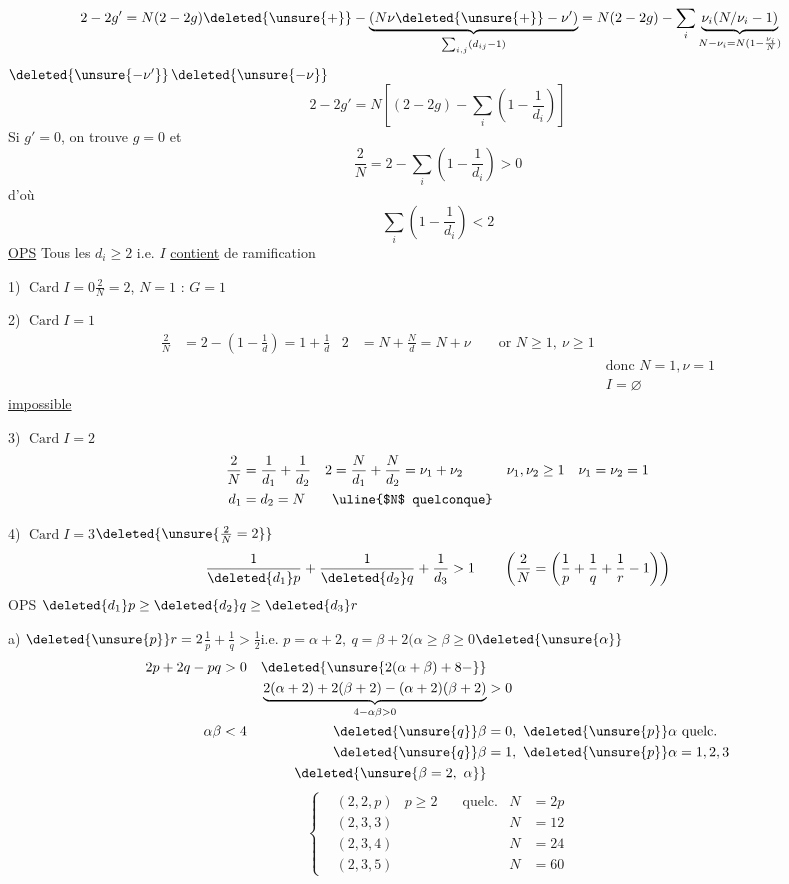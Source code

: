 \[
\begin{aligned}
2-2g'&=N(2-2g)\deleted{\unsure{+}}-\underbrace{(N\nu\deleted{\unsure{+}}-\nu')}_{\sum_{i,j}(d_{ij}-1)}=N(2-2g)-\sum_i\underbrace{\nu_i(N/\nu_i-1)}_{N-\nu_i=N(1-\frac{\nu_i}{N})}
\end{aligned}
\]
$\deleted{\unsure{-\nu'}}$\qquad $\deleted{\unsure{-\nu}}$
\[
\boxed{2-2g'=N\left[(2-2g)-\sum_i\left(1-\frac1{d_i}\right)\right]}
\]
Si $g'=0$, on trouve $g=0$ et
\[
\boxed{\frac2N=2-\sum_i\left(1-\frac1{d_i}\right)>0}
\]
d'où
\[
\sum_i\left(1-\frac1{d_i}\right)<2
\]
\uline{OPS} Tous les $d_i\geq2$  i.e. $I$ \uline{contient}  de ramification

1) $\operatorname{Card} I=0$\qquad $\frac2N=2$, $N=1$ :  $G=1$

2) $\operatorname{Card} I=1$
\[
\begin{aligned}
\frac2N&=2-\left(1-\frac1d\right)=1+\frac1d
&2&=N+\frac Nd=N+\nu\qquad\text{or }N\geq1,\ \nu\geq1\\
&&&&\text{donc }N=1,\nu=1\\
&&&& I=\varnothing
\end{aligned}
\]
\uline{impossible}

3) $\operatorname{Card} I=2$
\[
\begin{aligned}
\frac2N&=\frac1{d_1}+\frac1{d_2}& 2&=\frac N{d_1}+\frac N{d_2}=\nu_1+\nu_2
&\nu_1,\nu_2&\geq1\quad \nu_1=\nu_2=1\\
d_1&=d_2=N&&\text{\uline{$N$ quelconque}}
\end{aligned}
\]

4) $\operatorname{Card} I=3$\qquad $\deleted{\unsure{\frac2N=2}}$
\[
\frac1{\deleted{d_1}p}+\frac1{\deleted{d_2}q}+\frac1{d_3}>1\qquad
\left(\frac2N=\left(\frac1p+\frac1q+\frac1r-1\right)\right)
\]
OPS $\deleted{d_1}p\geq\deleted{d_2}q\geq\deleted{d_3}r$

a) $\deleted{\unsure{p}}r=2$\qquad $\frac1p+\frac1q>\frac12$\qquad i.e.  $p=\alpha+2,\ q=\beta+2$\qquad $(\alpha\geq\beta\geq0$\quad $\deleted{\unsure{\alpha}}$
\[
\begin{aligned}
2p+2q-pq&>0& \deleted{\unsure{2(\alpha+\beta)+8-}}&\\
&&\underbrace{2(\alpha+2)+2(\beta+2)-(\alpha+2)(\beta+2)}_{4-\alpha\beta>0}&>0\\
\alpha\beta&<4 &\deleted{\unsure{q}}\beta&=0,\ \deleted{\unsure{p}}\alpha\ \text{quelc.}\\
&&\deleted{\unsure{q}}\beta&=1,\ \deleted{\unsure{p}}\alpha=1,2,3\\
&&\deleted{\unsure{\beta=2,\ \alpha}}&
\end{aligned}
\]
\[
\left\{\begin{aligned}
&(2,2,p)& p\geq2&\quad\text{quelc.}& N&=2p\\
&(2,3,3)&&&N&=12\\
&(2,3,4)&&&N&=24\\
&(2,3,5)&&&N&=60
\end{aligned}\right.
\]

